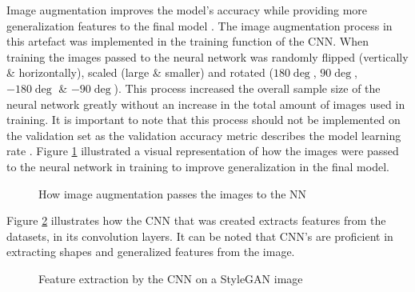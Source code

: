 Image augmentation improves the model's accuracy while providing more generalization features to the final model \citep{Wang}. The image augmentation process in this artefact was implemented in the training function of the CNN. When training the images passed to the neural network was randomly flipped (vertically \& horizontally), scaled (large \& smaller) and rotated ($180\deg$, $90\deg$, $-180\deg$ \& $-90\deg$). This process increased the overall sample size of the neural network greatly without an increase in the total amount of images used in training. It is important to note that this process should not be implemented on the validation set as the validation accuracy metric describes the model learning rate \citep{Wang}. Figure \ref{fig:faug} illustrated a visual representation of how the images were passed to the neural network in training to improve generalization in the final model.

\begin{figure}[H]%
\centering
{}%
\caption{How image augmentation passes the images to the NN}%
\label{fig:faug}%
\end{figure}

Figure \ref{fig:fetex} illustrates how the CNN that was created extracts features from the datasets, in its convolution layers. It can be noted that CNN's are proficient in extracting shapes and generalized features from the image.

\begin{figure}[H]%
\centering
{}%
\caption{Feature extraction by the CNN on a StyleGAN image}%
\label{fig:fetex}%
\end{figure}

